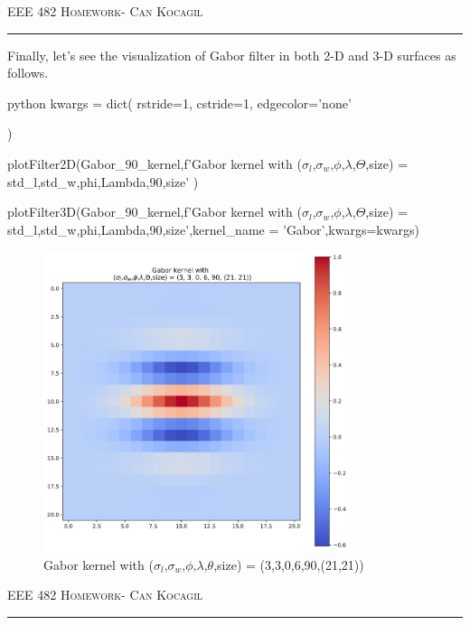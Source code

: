 \documentclass[12pt]{amsart}
\begin{document}
\newpage
{\scshape EEE 482} \hfill {\scshape \large  Homework-\relax} \hfill {\scshape Can Kocagil}
\smallskip
\hrule
\vspace{2mm}

Finally, let's see the visualization of Gabor filter in both 2-D and 3-D surfaces as follows.

\begin{mintedbox}{python}
kwargs = dict(
    rstride=1,
    cstride=1,     
    edgecolor='none'

)

plotFilter2D(Gabor_90_kernel,f'Gabor kernel with \n ($\sigma_l$,$\sigma_w$,$\phi$,$\lambda$,$\Theta$,size) = {std_l,std_w,phi,Lambda,90,size}'
)



plotFilter3D(Gabor_90_kernel,f'Gabor kernel with \n ($\sigma_l$,$\sigma_w$,$\phi$,$\lambda$,$\Theta$,size) = {std_l,std_w,phi,Lambda,90,size}',kernel_name = 'Gabor',kwargs=kwargs)
\end{mintedbox}




\begin{figure}[ht]
    \centering
    \includegraphics[width = 0.8\textwidth]{images/Gabor_90_2d.png}
    \caption{Gabor kernel with  ($\sigma_l$,$\sigma_w$,$\phi$,$\lambda$,$\theta$,size) = (3,3,0,6,90,(21,21))}
\end{figure}

\newpage
{\scshape EEE 482} \hfill {\scshape \large  Homework-\relax} \hfill {\scshape Can Kocagil}
\smallskip
\hrule
\vspace{2mm}
\end{document}

